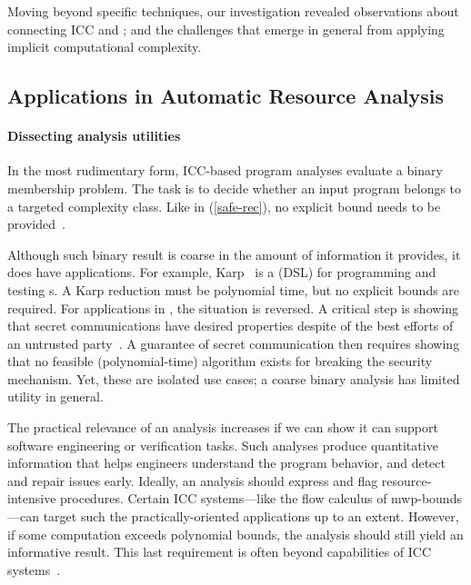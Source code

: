 Moving beyond specific techniques, our investigation revealed observations about
connecting ICC and ; and the challenges that
emerge in general from applying implicit computational complexity.

\subsection{Applications in Automatic Resource Analysis}
\label{subsec:res-resource-analysis}

\paragraph*{Dissecting analysis utilities}
In the most rudimentary form, ICC-based program analyses evaluate a binary
membership problem. The task is to decide whether an input program belongs to a
targeted complexity class. Like in 
(\autoref{safe-rec}), no explicit bound needs to be provided~\cite[p.
13]{moyen2017}.

Although such binary result is coarse in the amount of information it provides,
it does have applications. For example, Karp~\cite{zhang2022} is a
 (DSL) for programming and testing s. A Karp reduction must be polynomial time, but no explicit bounds
are required. For applications in , the situation is reversed.
A critical step is showing that secret communications have desired properties
despite of the best efforts of an untrusted party~\cite{rivest1990}. A guarantee
of secret communication then requires showing that no feasible (polynomial-time)
algorithm exists for breaking the security mechanism. Yet, these are isolated
use cases; a coarse binary analysis has limited utility in general.

The practical relevance of an analysis increases if we can show it can support
software engineering or verification tasks. Such analyses produce quantitative
information that helps engineers understand the program behavior, and detect and
repair issues early. Ideally, an analysis should express 
and flag resource-intensive procedures. Certain ICC systems---like the flow
calculus of mwp-bounds---can target such the practically-oriented applications
up to an extent. However, if some computation exceeds polynomial bounds, the
analysis should still yield an informative result. This last requirement is
often beyond capabilities of ICC systems~\cite{baillot2012}.

